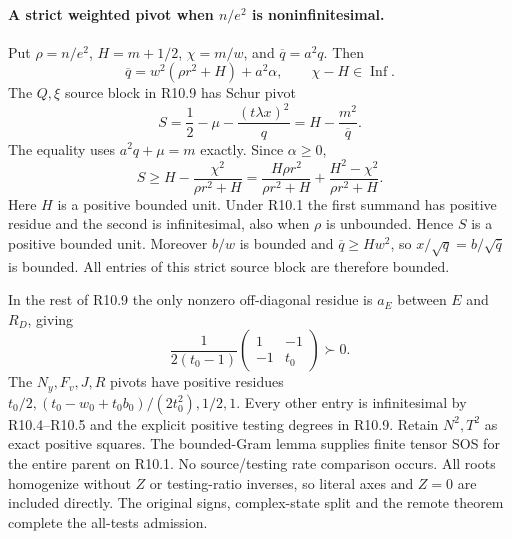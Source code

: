 \paragraph{A strict weighted pivot when $n/e^2$ is noninfinitesimal.}
Put $\rho=n/e^2$, $H=m+1/2$, $\chi=m/w$, and
$\overline q=a^2q$. Then
\[
 \overline q=w^2(\rho r^2+H)+a^2\alpha,
 \qquad \chi-H\in\operatorname{Inf}.
\tag{R10.10}
\]
The $Q,\xi$ source block in R10.9 has Schur pivot
\[
 S=\frac12-\mu-\frac{(t\lambda x)^2}{q}
   =H-\frac{m^2}{\overline q}.
\tag{R10.11}
\]
The equality uses $a^2q+\mu=m$ exactly. Since $\alpha\ge0$,
\[
 S\ge H-\frac{\chi^2}{\rho r^2+H}
 =\frac{H\rho r^2}{\rho r^2+H}
    +\frac{H^2-\chi^2}{\rho r^2+H}.
\tag{R10.12}
\]
Here $H$ is a positive bounded unit. Under R10.1 the first summand
has positive residue and the second is infinitesimal, also when
$\rho$ is unbounded. Hence $S$ is a positive bounded unit.
Moreover $b/w$ is bounded and $\overline q\ge Hw^2$, so
$x/\sqrt q=b/\sqrt{\overline q}$ is bounded. All entries of this
strict source block are therefore bounded.

In the rest of R10.9 the only nonzero off-diagonal residue is
$a_E$ between $E$ and $R_D$, giving
\[
 \frac1{2(t_0-1)}
 \begin{pmatrix}1&-1\\-1&t_0\end{pmatrix}\succ0.
\]
The $N_y,F_v,J,R$ pivots have positive residues
$t_0/2,(t_0-w_0+t_0b_0)/(2t_0^2),1/2,1$.
Every other entry is infinitesimal by R10.4--R10.5 and the explicit
positive testing degrees in R10.9. Retain $N^2,T^2$ as exact positive
squares. The bounded-Gram lemma supplies finite tensor SOS for the
entire parent on R10.1. No source/testing rate comparison occurs.
All roots homogenize without $Z$ or testing-ratio inverses, so literal
axes and $Z=0$ are included directly. The original signs, complex-state
split and the remote theorem complete the all-tests admission.

